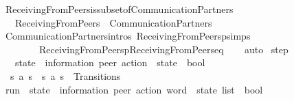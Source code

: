 \begin{isabellebody}
\endisatagproof
{\isafoldproof}%
%
\isadelimproof
\isanewline
%
\endisadelimproof
\isanewline
{}\isamarkupfalse%
\ ReceivingFromPeers{\isacharunderscore}{\kern0pt}is{\isacharunderscore}{\kern0pt}subset{\isacharunderscore}{\kern0pt}of{\isacharunderscore}{\kern0pt}CommunicationPartners{\isacharcolon}{\kern0pt}\isanewline
\ \ \ {\isachardoublequoteopen}ReceivingFromPeers\ {\isasymsubseteq}\ CommunicationPartners{\isachardoublequoteclose}\isanewline
%
\isadelimproof
\ \ %
\endisadelimproof
%
\isatagproof
{}\isamarkupfalse%
\ CommunicationPartners{\isachardot}{\kern0pt}intros\ ReceivingFromPeersp{\isachardot}{\kern0pt}simps\isanewline
\ \ \ \ \ \ \ \ ReceivingFromPeersp{\isacharunderscore}{\kern0pt}ReceivingFromPeers{\isacharunderscore}{\kern0pt}eq\isanewline
\ \ \isamarkupfalse%
\ auto%
\endisatagproof
{\isafoldproof}%
%
\isadelimproof
\isanewline
%
\endisadelimproof
\isanewline
{}\isamarkupfalse%
\ step\isanewline
\ \ {\isacharcolon}{\kern0pt}{\isacharcolon}{\kern0pt}\ {\isachardoublequoteopen}{\isacharprime}{\kern0pt}state\ {\isasymRightarrow}\ {\isacharparenleft}{\kern0pt}{\isacharprime}{\kern0pt}information{\isacharcomma}{\kern0pt}\ {\isacharprime}{\kern0pt}peer{\isacharparenright}{\kern0pt}\ action\ {\isasymRightarrow}\ {\isacharprime}{\kern0pt}state\ {\isasymRightarrow}\ bool{\isachardoublequoteclose}\ \ {\isacharparenleft}{\kern0pt}{\isachardoublequoteopen}{\isacharunderscore}{\kern0pt}\ {\isasymmidarrow}{\isacharunderscore}{\kern0pt}{\isasymrightarrow}\ {\isacharunderscore}{\kern0pt}{\isachardoublequoteclose}\ {\isacharbrackleft}{\kern0pt}{}{}{\isacharcomma}{\kern0pt}\ {}{}{\isacharcomma}{\kern0pt}\ {}{}{\isacharbrackright}{\kern0pt}\ {}{}{}{\isacharparenright}{\kern0pt}\isanewline
\ \ \isanewline
\ \ {\isachardoublequoteopen}s{}\ {\isasymmidarrow}a{\isasymrightarrow}\ s{}\ {\isasymequiv}\ {\isacharparenleft}{\kern0pt}s{}{\isacharcomma}{\kern0pt}\ a{\isacharcomma}{\kern0pt}\ s{}{\isacharparenright}{\kern0pt}\ {\isasymin}\ Transitions{\isachardoublequoteclose}\isanewline
\isanewline
{}\isamarkupfalse%
\ run\ {\isacharcolon}{\kern0pt}{\isacharcolon}{\kern0pt}\ {\isachardoublequoteopen}{\isacharprime}{\kern0pt}state\ {\isasymRightarrow}\ {\isacharparenleft}{\kern0pt}{\isacharprime}{\kern0pt}information{\isacharcomma}{\kern0pt}\ {\isacharprime}{\kern0pt}peer{\isacharparenright}{\kern0pt}\ action\ word\ {\isasymRightarrow}\ {\isacharprime}{\kern0pt}state\ list\ {\isasymRightarrow}\ bool{\isachardoublequoteclose}\ \isanewline

\end{isabellebody}
